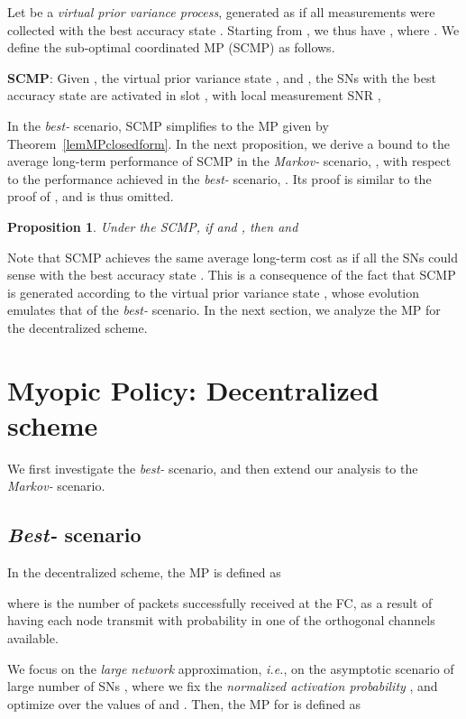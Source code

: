 \documentclass[10pt,twocolumn,twoside]{IEEEtran}
\newtheorem{propos}{Proposition}
\theoremstyle{plain}
\begin{document}
 Let  be a \emph{virtual prior variance process}, generated as if all measurements were collected with
 the best accuracy state . Starting from , we thus have ,
 where .
 We define the sub-optimal coordinated MP (SCMP) as follows.


  \noindent\textbf{SCMP}:
Given , the virtual prior variance state , and , 
the
  SNs with the best accuracy state are activated  in slot ,
 with local measurement SNR ,


In the \emph{best-} scenario, SCMP simplifies to the MP given by Theorem~\ref{lemMPclosedform}.
 In the next proposition, we derive a bound to the average long-term performance of SCMP 
in the \emph{Markov-} scenario,
, with respect to the performance achieved
in the \emph{best-} scenario, .
Its proof is similar to the proof of \cite[Theorem 3]{MichelusiP1}, and is thus omitted.
\begin{propos}
Under the SCMP, if  
and , then  and

\end{propos}
Note that SCMP achieves the same average long-term cost as if all the SNs could sense with the best accuracy state .
This is a consequence of the fact that SCMP is generated according to the virtual prior variance  state , whose evolution
emulates that of the \emph{best-} scenario.
In the next section, we analyze the MP for the decentralized scheme.
\vspace{-3mm}
\section{Myopic Policy: Decentralized scheme}
\label{analysisDistr}
\noindent We first investigate the \emph{best-} scenario, and then
 extend our analysis to the \emph{Markov-} scenario.
 \vspace{-3mm}
\subsection{\emph{Best-} scenario}
\label{bestomegadistr}
\noindent In the decentralized scheme, the MP is defined as

where  is the number of packets successfully received at the FC, as a result of having each node transmit
with probability  in one of the  orthogonal channels available.

We focus on the \emph{large network} approximation, \emph{i.e.},
on the asymptotic  scenario of large number of SNs
, where we fix the \emph{normalized activation probability} , and optimize over the values of  and .
Then, the MP for  is defined as
\end{document}
